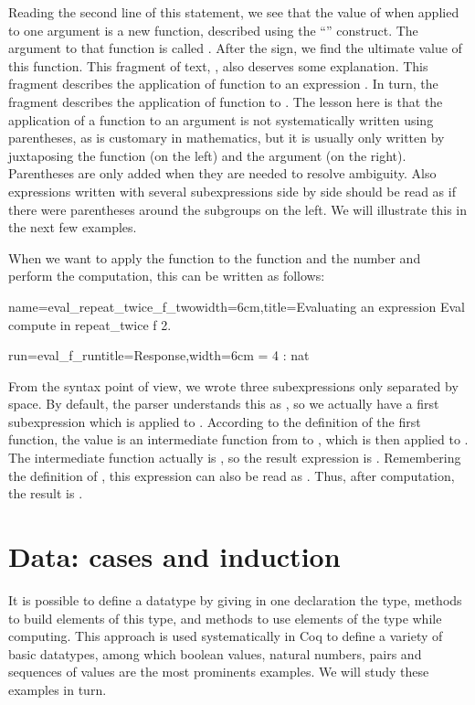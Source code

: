 Reading the second line of this statement, we see that the value
of  when applied to one argument is a new
function, described using the ``'' construct.  The
argument to that function is called .  After the \C{=>} sign, we
find the ultimate value of this function.  This fragment of text, , also deserves some explanation.  This fragment describes the
application of function  to an expression .  In turn,
the fragment  describes the application of function  to
.  The lesson here is that the application of a function to an
argument is not systematically written using parentheses, as is
customary in mathematics, but it is usually only written by
juxtaposing the function (on the left) and the argument (on the
right).  Parentheses are only added when they are needed to resolve
ambiguity.  Also expressions written with several subexpressions side
by side should be read as if there were parentheses around the
subgroups on the left.  We will illustrate this in the next few
examples.

When we want to apply the function  to the function
 and the number  and perform the computation, this can be
written as follows:
\begin{coq}{name=eval_repeat_twice_f_two}{width=6cm,title=Evaluating
    an expression}
Eval compute in repeat_twice f 2.
\end{coq}
\begin{coqout}{run=eval_f_run}{title=Response,width=6cm}
  = 4 : nat
\end{coqout}
From the syntax point of view, we wrote three subexpressions only
separated by space.  By default, the parser understands this as
, so we actually have a first subexpression
which is  applied to .  According to the
definition of the first function, the value is an intermediate
function from 
to , which is then applied to .  The intermediate function
actually is , so the result expression is .  Remembering the definition of , this expression can also
be read as .  Thus, after computation, the result is .

\section{Data: cases and induction}
It is possible to define a datatype by giving in one declaration
the type, methods to build elements of this type, and methods to
use elements of the type while computing.  This approach is used
systematically in Coq to define a variety of basic datatypes, among
which boolean values, natural numbers, pairs and sequences of values
are the most prominents examples.  We will study these examples in
turn.
